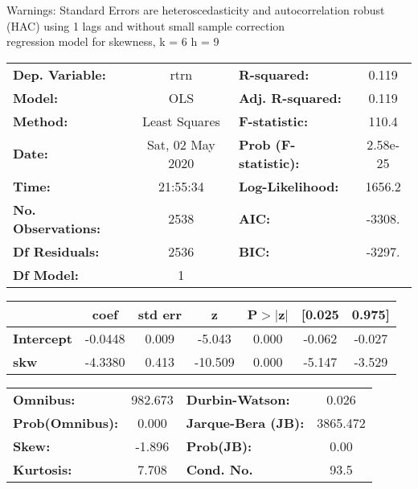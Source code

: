 Warnings: \newline
 [1] Standard Errors are heteroscedasticity and autocorrelation robust (HAC) using 1 lags and without small sample correction\\ 

regression model for skewness, k = 6 h = 9\begin{center}
\begin{tabular}{lclc}
\toprule
\textbf{Dep. Variable:}    &       rtrn       & \textbf{  R-squared:         } &     0.119   \\
\textbf{Model:}            &       OLS        & \textbf{  Adj. R-squared:    } &     0.119   \\
\textbf{Method:}           &  Least Squares   & \textbf{  F-statistic:       } &     110.4   \\
\textbf{Date:}             & Sat, 02 May 2020 & \textbf{  Prob (F-statistic):} &  2.58e-25   \\
\textbf{Time:}             &     21:55:34     & \textbf{  Log-Likelihood:    } &    1656.2   \\
\textbf{No. Observations:} &        2538      & \textbf{  AIC:               } &    -3308.   \\
\textbf{Df Residuals:}     &        2536      & \textbf{  BIC:               } &    -3297.   \\
\textbf{Df Model:}         &           1      & \textbf{                     } &             \\
\bottomrule
\end{tabular}
\begin{tabular}{lcccccc}
                   & \textbf{coef} & \textbf{std err} & \textbf{z} & \textbf{P$> |$z$|$} & \textbf{[0.025} & \textbf{0.975]}  \\
\midrule
\textbf{Intercept} &      -0.0448  &        0.009     &    -5.043  &         0.000        &       -0.062    &       -0.027     \\
\textbf{skw}       &      -4.3380  &        0.413     &   -10.509  &         0.000        &       -5.147    &       -3.529     \\
\bottomrule
\end{tabular}
\begin{tabular}{lclc}
\textbf{Omnibus:}       & 982.673 & \textbf{  Durbin-Watson:     } &    0.026  \\
\textbf{Prob(Omnibus):} &   0.000 & \textbf{  Jarque-Bera (JB):  } & 3865.472  \\
\textbf{Skew:}          &  -1.896 & \textbf{  Prob(JB):          } &     0.00  \\
\textbf{Kurtosis:}      &   7.708 & \textbf{  Cond. No.          } &     93.5  \\
\bottomrule
\end{tabular}
\end{center}

